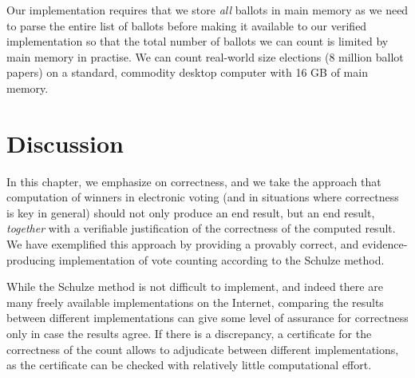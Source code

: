 Our implementation requires that we store \emph{all}
ballots in main memory as we need to parse the entire list of
ballots before making it available to our verified implementation so
that the total number of ballots we can count is limited by main
memory in practise. We can count real-world size elections (8
million ballot papers) on a standard, commodity desktop computer with
16 GB of main memory. 

  
\section{Discussion} \label{sec:discussion}

In this chapter,  we emphasize on correctness, 
and we take the approach that computation of winners in
electronic voting (and in situations where correctness is key in
general) should not only produce an end result, but an end result,
\emph{together} with a verifiable justification of the correctness
of the computed result. We have exemplified this
approach by providing a provably correct, and evidence-producing
implementation of vote counting according to the Schulze method. 

While the Schulze method is not difficult to implement, and indeed
there are many freely available implementations on the Internet, 
comparing the
results between different implementations can give some level of
assurance for correctness only in case the results agree.  If there
is a discrepancy, a certificate for the correctness of the count
allows to adjudicate between different implementations, as the
certificate can be checked with relatively little computational
effort. 

